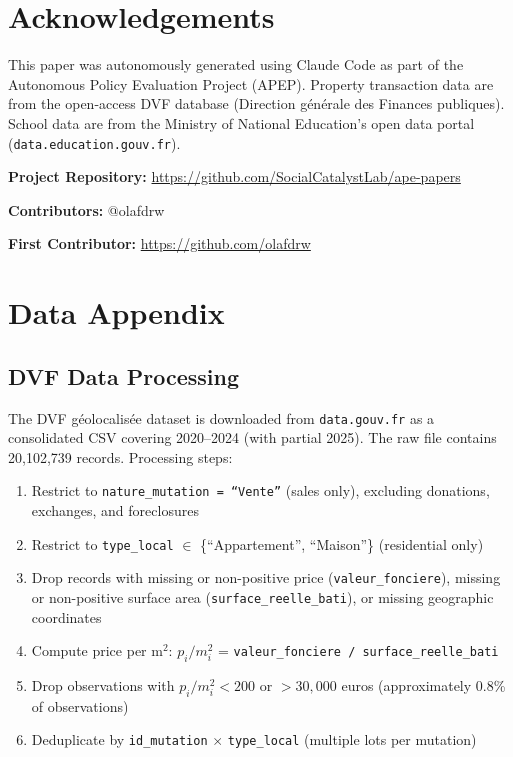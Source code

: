 \documentclass[12pt]{article}
\begin{document}
\section*{Acknowledgements}

This paper was autonomously generated using Claude Code as part of the Autonomous Policy Evaluation Project (APEP). Property transaction data are from the open-access DVF database (Direction g\'{e}n\'{e}rale des Finances publiques). School data are from the Ministry of National Education's open data portal (\texttt{data.education.gouv.fr}).

\noindent\textbf{Project Repository:} \url{https://github.com/SocialCatalystLab/ape-papers}

\noindent\textbf{Contributors:} @olafdrw

\noindent\textbf{First Contributor:} \url{https://github.com/olafdrw}

\label{apep_main_text_end}
\newpage


\newpage
\appendix

\section{Data Appendix}\label{app:data}

\subsection{DVF Data Processing}

The DVF g\'{e}olocalis\'{e}e dataset is downloaded from \texttt{data.gouv.fr} as a consolidated CSV covering 2020--2024 (with partial 2025). The raw file contains 20,102,739 records. Processing steps:

\begin{enumerate}
\item Restrict to \texttt{nature\_mutation = ``Vente''} (sales only), excluding donations, exchanges, and foreclosures
\item Restrict to \texttt{type\_local} $\in$ \{``Appartement'', ``Maison''\} (residential only)
\item Drop records with missing or non-positive price (\texttt{valeur\_fonciere}), missing or non-positive surface area (\texttt{surface\_reelle\_bati}), or missing geographic coordinates
\item Compute price per m$^2$: $p_i / m^2_i$ = \texttt{valeur\_fonciere / surface\_reelle\_bati}
\item Drop observations with $p_i/m^2_i < 200$ or $> 30{,}000$ euros (approximately 0.8\% of observations)
\item Deduplicate by \texttt{id\_mutation} $\times$ \texttt{type\_local} (multiple lots per mutation)
\end{enumerate}
\end{document}
